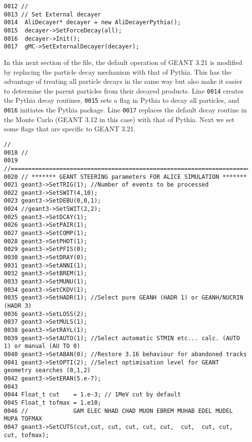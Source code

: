 \scriptsize
\begin{verbatim}
0012 //
0013 // Set External decayer
0014  AliDecayer* decayer = new AliDecayerPythia();
0015  decayer->SetForceDecay(all);
0016  decayer->Init();
0017  gMC->SetExternalDecayer(decayer);
\end{verbatim}
\normalsize

In this next section of the file, the default operation of GEANT 3.21 is
modified by replacing the particle decay mechanism with that of Pythia. This
has the advantage of treating all particle decays in the same way but also make
it easier to determine the parent particles from their decayed products. Line
\texttt{0014} creates the Pythia decay routines, \texttt{0015} sets a flag
in Pythia to decay all particles, and \texttt{0016} initiates the Pythia
package. Line \texttt{0017} replaces the default decay routine in the Monte
Carlo (GEANT 3.12 in this case) with that of Pythia. Next we set some flags
that are specific to GEANT 3.21.

\scriptsize
\begin{verbatim}//
0018 //
0019 //=======================================================================
0020 // ******* GEANT STEERING parameters FOR ALICE SIMULATION *******
0021 geant3->SetTRIG(1); //Number of events to be processed 
0022 geant3->SetSWIT(4,10);
0023 geant3->SetDEBU(0,0,1);
0024 //geant3->SetSWIT(2,2);
0025 geant3->SetDCAY(1);
0026 geant3->SetPAIR(1);
0027 geant3->SetCOMP(1);
0028 geant3->SetPHOT(1);
0029 geant3->SetPFIS(0);
0030 geant3->SetDRAY(0);
0031 geant3->SetANNI(1);
0032 geant3->SetBREM(1);
0033 geant3->SetMUNU(1);
0034 geant3->SetCKOV(1);
0035 geant3->SetHADR(1); //Select pure GEANH (HADR 1) or GEANH/NUCRIN (HADR 3)
0036 geant3->SetLOSS(2);
0037 geant3->SetMULS(1);
0038 geant3->SetRAYL(1);
0039 geant3->SetAUTO(1); //Select automatic STMIN etc... calc. (AUTO 1) or manual (AU TO 0)
0040 geant3->SetABAN(0); //Restore 3.16 behaviour for abandoned tracks
0041 geant3->SetOPTI(2); //Select optimisation level for GEANT geometry searches (0,1,2)
0042 geant3->SetERAN(5.e-7);
0043 
0044 Float_t cut    = 1.e-3; // 1MeV cut by default
0045 Float_t tofmax = 1.e10;
0046 //             GAM ELEC NHAD CHAD MUON EBREM MUHAB EDEL MUDEL MUPA TOFMAX
0047 geant3->SetCUTS(cut,cut, cut, cut, cut, cut,  cut,  cut, cut,  cut, tofmax);
\end{verbatim}
\normalsize

